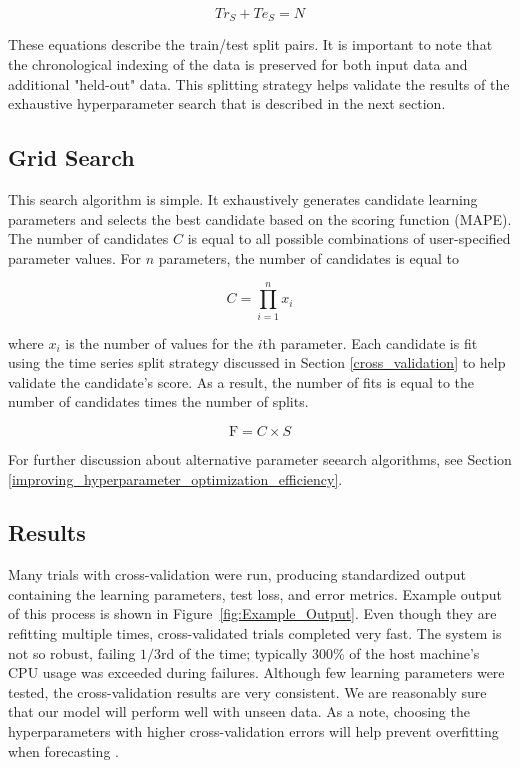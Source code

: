 \documentclass[11pt, oneside]{report}
\begin{document}
\begin{equation}
  \label{eq:6}
  Tr_{S} + Te_{S} = N
\end{equation}

These equations describe the train/test split pairs. It is important to note that the chronological indexing of the data is preserved for both input data and additional "held-out" data. This splitting strategy helps validate the results of the exhaustive hyperparameter search that is described in the next section.
\subsection{Grid Search}
This search algorithm is simple. It exhaustively generates candidate learning parameters and selects the best candidate based on the scoring function (MAPE). The number of candidates $C$ is equal to all possible combinations of user-specified parameter values. For $n$ parameters, the number of candidates is equal to

\begin{equation}
  C = \prod_{i=1}^{n} x_i
\end{equation}

\noindent where $x_i$ is the number of values for the $i$th parameter. Each candidate is fit using the time series split strategy discussed in Section \ref{cross_validation} to help validate the candidate's score. As a result, the number of fits is equal to the number of candidates times the number of splits.

\begin{equation}
  \text{F} = C \times S
\end{equation}

\noindent For further discussion about alternative parameter seearch algorithms, see Section \ref{improving_hyperparameter_optimization_efficiency}.

\subsection{Results}
Many trials with cross-validation were run, producing standardized output containing the learning parameters, test loss, and error metrics. Example output of this process is shown in Figure~\ref{fig:Example_Output}. Even though they are refitting multiple times, cross-validated trials completed very fast. The system is not so robust, failing $1/3$rd of the time; typically 300\% of the host machine's CPU usage was exceeded during failures. Although few learning parameters were tested, the cross-validation results are very consistent. We are reasonably sure that our model will perform well with unseen data. As a note, choosing the hyperparameters with higher cross-validation errors will help prevent overfitting when forecasting \cite{ng}.
\end{document}
